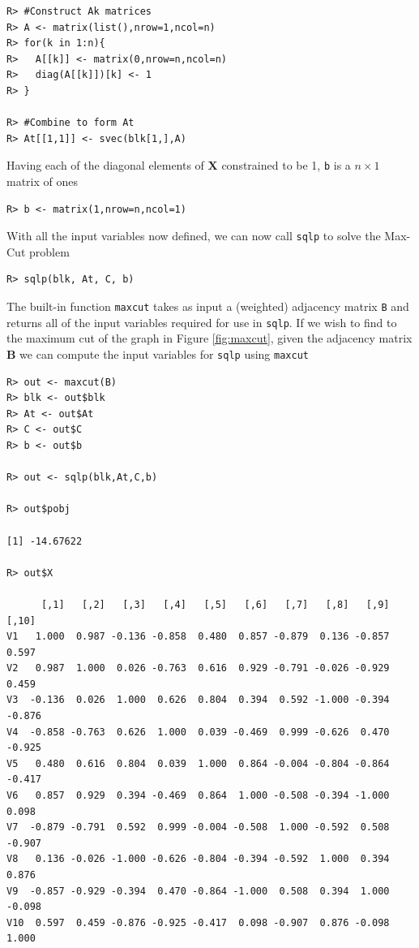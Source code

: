 \documentclass{article}
\newcommand{\m}[1]{\mathbf{#1}}               %
\begin{document}
\begin{verbatim}
R> #Construct Ak matrices
R> A <- matrix(list(),nrow=1,ncol=n)
R> for(k in 1:n){
R>   A[[k]] <- matrix(0,nrow=n,ncol=n)
R>   diag(A[[k]])[k] <- 1
R> }

R> #Combine to form At
R> At[[1,1]] <- svec(blk[1,],A)
\end{verbatim}

Having each of the diagonal elements of $\m{X}$ constrained to be 1, \verb!b! is a $n \times 1$ matrix of ones

\begin{verbatim}
R> b <- matrix(1,nrow=n,ncol=1)
\end{verbatim}

With all the input variables now defined, we can now call \verb!sqlp! to solve the Max-Cut problem

\begin{verbatim}
R> sqlp(blk, At, C, b)
\end{verbatim}

The built-in function \verb!maxcut! takes as input a (weighted) adjacency matrix \verb!B! and returns all of the input variables required for use in \verb!sqlp!. If we wish to find to the maximum cut of the graph in Figure \ref{fig:maxcut}, given the adjacency matrix $\m{B}$ we can compute the input variables for \verb!sqlp! using \verb!maxcut!

\begin{verbatim}
R> out <- maxcut(B)
R> blk <- out$blk
R> At <- out$At
R> C <- out$C
R> b <- out$b

R> out <- sqlp(blk,At,C,b)

R> out$pobj

[1] -14.67622

R> out$X

      [,1]   [,2]   [,3]   [,4]   [,5]   [,6]   [,7]   [,8]   [,9]  [,10]
V1   1.000  0.987 -0.136 -0.858  0.480  0.857 -0.879  0.136 -0.857  0.597
V2   0.987  1.000  0.026 -0.763  0.616  0.929 -0.791 -0.026 -0.929  0.459
V3  -0.136  0.026  1.000  0.626  0.804  0.394  0.592 -1.000 -0.394 -0.876
V4  -0.858 -0.763  0.626  1.000  0.039 -0.469  0.999 -0.626  0.470 -0.925
V5   0.480  0.616  0.804  0.039  1.000  0.864 -0.004 -0.804 -0.864 -0.417
V6   0.857  0.929  0.394 -0.469  0.864  1.000 -0.508 -0.394 -1.000  0.098
V7  -0.879 -0.791  0.592  0.999 -0.004 -0.508  1.000 -0.592  0.508 -0.907
V8   0.136 -0.026 -1.000 -0.626 -0.804 -0.394 -0.592  1.000  0.394  0.876
V9  -0.857 -0.929 -0.394  0.470 -0.864 -1.000  0.508  0.394  1.000 -0.098
V10  0.597  0.459 -0.876 -0.925 -0.417  0.098 -0.907  0.876 -0.098  1.000
\end{verbatim}
\end{document}
